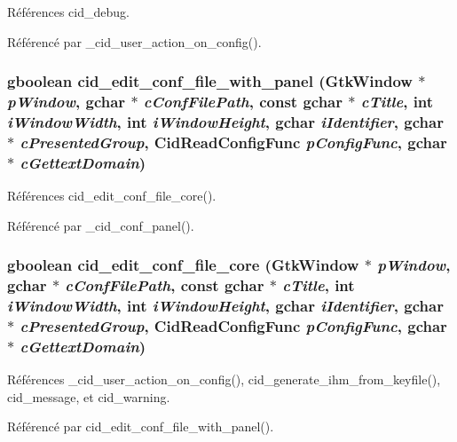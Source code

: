 Références cid\_\-debug.

Référencé par \_\-cid\_\-user\_\-action\_\-on\_\-config().
\subsubsection{\setlength{\rightskip}{0pt plus 5cm}gboolean cid\_\-edit\_\-conf\_\-file\_\-with\_\-panel (GtkWindow $\ast$ {\em pWindow}, \/  gchar $\ast$ {\em cConfFilePath}, \/  const gchar $\ast$ {\em cTitle}, \/  int {\em iWindowWidth}, \/  int {\em iWindowHeight}, \/  gchar {\em iIdentifier}, \/  gchar $\ast$ {\em cPresentedGroup}, \/  {\bf CidReadConfigFunc} {\em pConfigFunc}, \/  gchar $\ast$ {\em cGettextDomain})}\label{cid-conf-panel-factory_8c_527e5da831d6d9f18f2739316bfda493}




Références cid\_\-edit\_\-conf\_\-file\_\-core().

Référencé par \_\-cid\_\-conf\_\-panel().
\subsubsection{\setlength{\rightskip}{0pt plus 5cm}gboolean cid\_\-edit\_\-conf\_\-file\_\-core (GtkWindow $\ast$ {\em pWindow}, \/  gchar $\ast$ {\em cConfFilePath}, \/  const gchar $\ast$ {\em cTitle}, \/  int {\em iWindowWidth}, \/  int {\em iWindowHeight}, \/  gchar {\em iIdentifier}, \/  gchar $\ast$ {\em cPresentedGroup}, \/  {\bf CidReadConfigFunc} {\em pConfigFunc}, \/  gchar $\ast$ {\em cGettextDomain})}\label{cid-conf-panel-factory_8c_d634715d7795c19e064e4c29dd9b3632}




Références \_\-cid\_\-user\_\-action\_\-on\_\-config(), cid\_\-generate\_\-ihm\_\-from\_\-keyfile(), cid\_\-message, et cid\_\-warning.

Référencé par cid\_\-edit\_\-conf\_\-file\_\-with\_\-panel().
